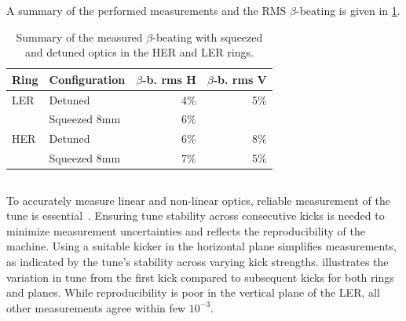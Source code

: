 A summary of the performed measurements and the RMS $\beta$-beating is given in
\cref{tab:kek:summary_beating}.

\begin{table}
    \centering
    \begin{tabular}{llrr}
        \toprule
        Ring & Configuration & $\beta$-b. rms H & $\beta$-b. rms V \\
        \midrule
        LER  &  Detuned      & 4\%              & 5\%   \\
            &  Squeezed 8mm & 6\%              &       \\
        HER  &  Detuned      & 6\%              & 8\%  \\
            &  Squeezed 8mm & 7\%              & 5\%  \\
        \bottomrule
    \end{tabular}
    \caption{Summary of the measured $\beta$-beating with squeezed and detuned optics in the HER
    and LER rings.}
    \label{tab:kek:summary_beating}
\end{table}



\FloatBarrier
\subsection{}

\FloatBarrier
\subsubsection{}

To accurately measure linear and non-linear optics, reliable measurement of the tune is essential~\cite{thrane_measuring_2020}. Ensuring
tune stability across consecutive kicks is needed to minimize measurement uncertainties and reflects
the reproducibility of the machine. 
Using a suitable kicker in the horizontal plane simplifies measurements, as indicated by the tune's 
stability across varying kick strengths.
 illustrates the variation in tune from the first kick compared to subsequent
kicks for both rings and planes.
While reproducibility is poor in the vertical plane of the LER, all other
measurements agree within few $10^{-3}$.

